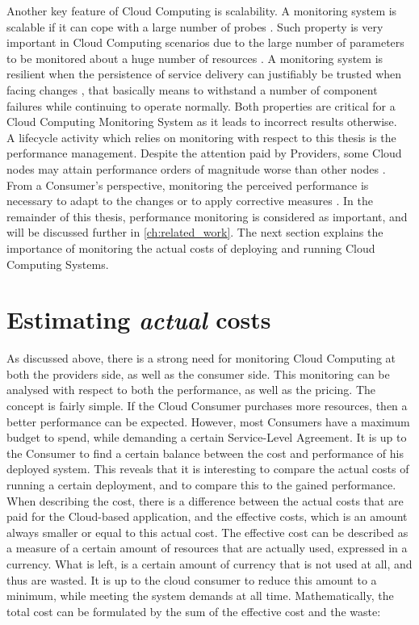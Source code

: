 \noindent
Another key feature of Cloud Computing is scalability. A monitoring system is scalable if it can cope with a large number of probes \cite{clayman2010monitoring}. Such property is very important in Cloud Computing scenarios due to the large number of parameters to be monitored about a huge number of resources \cite{aceto2013cloud}. A monitoring system is resilient when the persistence of service delivery can justifiably be trusted when facing changes \cite{laprie2008dependability}, that basically means to withstand a number of component failures while continuing to operate normally. Both properties are critical for a Cloud Computing Monitoring System as it leads to incorrect results otherwise.\\

\noindent
A lifecycle activity which relies on monitoring with respect to this thesis is the performance management. Despite the attention paid by Providers, some Cloud nodes may attain performance orders of magnitude worse than other nodes \cite{fox2009above}. From a Consumer's perspective, monitoring the perceived performance is necessary to adapt to the changes or to apply corrective measures \cite{aceto2013cloud}. In the remainder of this thesis, performance monitoring is considered as important, and will be discussed further in \autoref{ch:related_work}. The next section explains the importance of monitoring the actual costs of deploying and running Cloud Computing Systems.

\section{Estimating \textit{actual} costs} \label{sec:intro_pricing}
As discussed above, there is a strong need for monitoring Cloud Computing at both the providers side, as well as the consumer side. This monitoring can be analysed with respect to both the performance, as well as the pricing. The concept is fairly simple. If the Cloud Consumer purchases more resources, then a better performance can be expected. However, most Consumers have a maximum budget to spend, while demanding a certain Service-Level Agreement. It is up to the Consumer to find a certain balance between the cost and performance of his deployed system. This reveals that it is interesting to compare the actual costs of running a certain deployment, and to compare this to the gained performance. When describing the cost, there is a difference between the actual costs that are paid for the Cloud-based application, and the effective costs, which is an amount always smaller or equal to this actual cost. The effective cost can be described as a measure of a certain amount of resources that are actually used, expressed in a currency. What is left, is a certain amount of currency that is not used at all, and thus are wasted. It is up to the cloud consumer to reduce this amount to a minimum, while meeting the system demands at all time. Mathematically, the total cost can be formulated by the sum of the effective cost and the waste:

